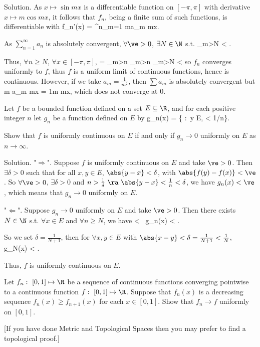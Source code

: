 Solution. As $x\mapsto \sin mx$ is a differentiable function on $[-\pi,\pi]$ with derivative $x\mapsto m\cos mx$, it follows that $f_n$, being a finite sum of such functions, is differentiable with 
\be
f_n'(x) = \sum^n_{m=1} ma_m \cos mx.
\ee

As $\sum^\infty_{n=1}a_n$ is absolutely convergent, $\forall \ve>0$, $\exists N\in \N$ s.t. 
\be
\sum_{m>N} < \ve.
\ee

Thus, $\forall n\geq N$, $\forall x\in [-\pi,\pi]$,
\be
{} =  \leq \sum_{m>n} \leq \sum_{m>n}  \leq \sum_{m>N} < \ve
\ee
so $f_n$ converges uniformly to $f$, thus $f$ is a uniform limit of continuous functions, hence is continuous. However, if we take $a_m = \frac 1{m^2}$, then $\sum a_m$ is absolutely convergent but 
\be
\sum m a_m \cos mx = \sum \frac 1m \cos mx,
\ee
which does not converge at 0.

\begin{exercise}
Let $f$ be a bounded function defined on a set $E \subseteq \R$, and for each positive integer $n$ let $g_n$ be a function defined on $E$ by
\be
g_n(x) = \sup\{ :\ y \in E,  < 1/n\}.
\ee

Show that $f$ is uniformly continuous on $E$ if and only if $g_n \to 0$ uniformly on $E$ as $n \to \infty$.
\end{exercise}

Solution. "$\Longrightarrow$". Suppose $f$ is uniformly continuous on $E$ and take $\ve>0$. Then $\exists \delta >0$ such that for all $x,y\in E$, $\abs{y-x}< \delta$, with $\abs{f(y)-f(x)}< \ve$. So $\forall \ve >0$, $\exists \delta >0$ and $n> \frac 1{\delta} \ \ra \ \abs{y-x}<\frac 1n < \delta$, we have $g_n(x) < \ve$, which means that $g_n \to 0$ uniformly on $E$.

"$\Longleftarrow$". Suppose $g_n \to 0$ uniformly on $E$ and take $\ve>0$. Then there exists $N\in \N$ s.t. $\forall x\in E$ and $\forall n \geq N$, we have
\be
{} < \ve \ \ra g_n(x) < \ve.
\ee

So we set $\delta = \frac 1{N+1}$, then for $\forall x,y \in E$ with $\abs{x-y} < \delta = \frac 1{N+1} < \frac 1N$,
\be
{} \leq g_N(x) < \ve.
\ee

Thus, $f$ is uniformly continuous on $E$.

\begin{exercise}
Let $f_n :\ [0, 1] \mapsto \R$ be a sequence of continuous functions converging pointwise to a continuous function $f :\ [0, 1] \mapsto \R$. Suppose that $f_n(x)$ is a decreasing sequence $f_n(x) \geq f_{n+1}(x)$ for each $x \in [0, 1]$. Show that $f_n \to f$ uniformly on $[0, 1]$.

[If you have done Metric and Topological Spaces then you may prefer to find a topological proof.]
\end{exercise}

